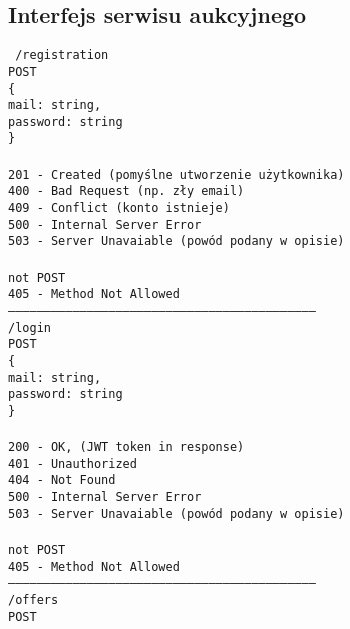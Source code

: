 \documentclass[12pt, notitlepage]{article}
\begin{document}
\newpage
\setlength\parindent{24pt}
\begin{appendices}
\section{Interfejs serwisu aukcyjnego} \label{app:endpoints}
\footnotesize
\texttt{
/registration \\
POST \\
\{\\
\indent mail: \indent		string,\\
\indent	password:	string\\
\}\\
\\
201 - Created (pomyślne utworzenie użytkownika)\\
400 - Bad Request (np. zły email)\\
409 - Conflict (konto istnieje)\\
500 - Internal Server Error\\
503 - Server Unavaiable (powód podany w opisie)\\
\\
not POST \\
405 - Method Not Allowed 
\\ ---------------------------------------------------------------------------------------------------------------------------------
\\
/login\\
POST \\
\{\\
\indent    mail:	\indent	string,\\
\indent    password:	string\\
\}\\
\\
200 - OK, (JWT token in response)\\
401 - Unauthorized\\
404 - Not Found\\
500 - Internal Server Error\\
503 - Server Unavaiable (powód podany w opisie)\\
\\
not POST\\
405 - Method Not Allowed\\
---------------------------------------------------------------------------------------------------------------------------------\\
/offers\\
POST\\
}
\end{appendices}
\end{document}
